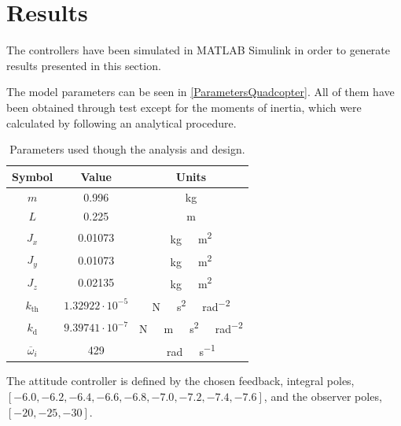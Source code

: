 \section{Results}
The controllers have been simulated in MATLAB Simulink in order to generate results presented in this section. 

The model parameters can be seen in \autoref{ParametersQuadcopter}. All of them have been obtained through test except for the moments of inertia, which were calculated by following an analytical procedure.

\begin{table}[H]
    \centering
    \begin{tabular}{c|c|c}
        \textbf{Symbol} &\textbf{Value} &\textbf{Units}\\
        \hline %
        $m$ & 0.996       &kg\\
        \hline %
        $L$  &   0.225       & m\\
        \hline %
        $J_x$  & 0.01073       & \si{kg \  m^2}\\
        \hline %
        $J_y$  & 0.01073       & \si{kg \  m^2}\\
        \hline %
        $J_z$  & 0.02135       & \si{kg \  m^2}\\
        \hline %
        $k_{\mathrm{th}}$  & $1.32922\cdot10^{-5}$       & \si{N \  s^2 \  rad^{-2}}\\
        \hline %
        $k_{\mathrm{d}}$  & $9.39741 \cdot10^{-7}$       & \si{N \  m \  s^2 \  rad^{-2}}\\
        \hline %
        $\overline{\omega}_i$& 429      & \si{rad \ s^{-1}}\\
        
    \end{tabular}
    \caption{Parameters used though the analysis and design.}
    \label{ParametersQuadcopter}
\end{table}
The attitude controller is defined by the chosen feedback, integral poles, \\$[-6.0, -6.2, -6.4, -6.6, -6.8, -7.0, -7.2, -7.4, -7.6]$, and  the observer poles, $[-20, -25, -30]$.

